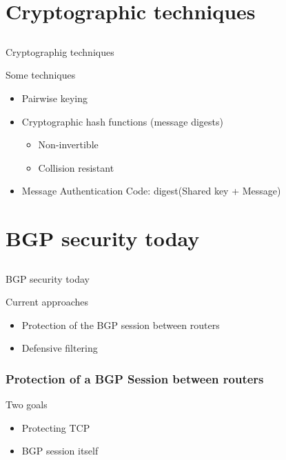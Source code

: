 \documentclass[notes=hide,yellow]{beamer}
\begin{document}
\section{Cryptographic techniques}
\subsection*{}


\begin{frame}{Cryptographig techniques}
	\begin{block}{Some techniques}
	\begin{itemize}
		\item Pairwise keying %
		\item Cryptographic hash functions (message digests) %
		\begin{itemize} 
			\item Non-invertible
			\item Collision resistant
		\end{itemize}
		\item Message Authentication Code: digest(Shared key + Message) 
	\end{itemize}
	\end{block}
\end{frame}

\section{BGP security today}
\subsection*{}

\begin{frame}{BGP security today}
	\begin{block}{Current approaches}
	\begin{itemize}
		\item Protection of the BGP session between routers
		\item Defensive filtering
	\end{itemize}
	\end{block}
\end{frame}

\begin{frame}
	\frametitle{Protection of a BGP Session between routers}
	\begin{block}{Two goals}
	\begin{itemize}
		\item Protecting TCP 
		\item BGP session itself
	\end{itemize}
	\end{block}
\end{frame}
\end{document}

